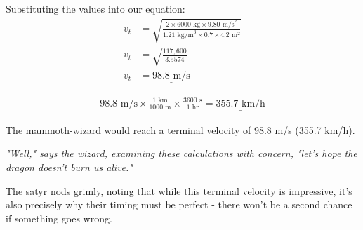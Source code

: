 \documentclass[12pt]{article}
\begin{document}
\begin{tcolorbox}[colback=boxcolor!40,colframe=boxcolor!60,title=\textbf{Mathematical Solution}]
Substituting the values into our equation:
\begin{align*}
    v_t &= \sqrt{\frac{2 \times 6000\text{ kg} \times 9.80\text{ m/s}^2}{1.21\text{ kg/m}^3 \times 0.7 \times 4.2\text{ m}^2}} \\[0.3cm]
    v_t &= \sqrt{\frac{117,600}{3.5574}} \\[0.3cm]
    v_t &= \underline{98.8\text{ m/s}}
\end{align*}
\end{tcolorbox}

\begin{tcolorbox}[colback=boxcolor!40,colframe=boxcolor!60,title=\textbf{Conversion to Kilometers per Hour}]
\begin{align*}
    98.8\text{ m/s} \times \frac{1\text{ km}}{1000\text{ m}} \times \frac{3600\text{ s}}{1\text{ hr}} = \underline{355.7\text{ km/h}}
\end{align*}
\end{tcolorbox}

\begin{tcolorbox}[colback=boxcolor!40,colframe=boxcolor!60,title=\textbf{Conclusion}]
The mammoth-wizard would reach a terminal velocity of 98.8 m/s (355.7 km/h).

\vspace{0.3cm}
\textit{"Well," says the wizard, examining these calculations with concern, "let's hope the dragon doesn't burn us alive."}

\vspace{0.2cm}
The satyr nods grimly, noting that while this terminal velocity is impressive, it's also precisely why their timing must be perfect - there won't be a second chance if something goes wrong.
\end{tcolorbox}
\end{document}
